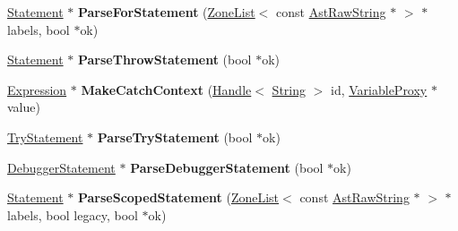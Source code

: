 \begin{DoxyCompactItemize}
\item 
\hyperlink{classv8_1_1internal_1_1_statement}{Statement} $\ast$ {\bfseries Parse\+For\+Statement} (\hyperlink{classv8_1_1internal_1_1_zone_list}{Zone\+List}$<$ const \hyperlink{classv8_1_1internal_1_1_ast_raw_string}{Ast\+Raw\+String} $\ast$ $>$ $\ast$labels, bool $\ast$ok)\hypertarget{classv8_1_1internal_1_1_parser_a984315c07481790a7187dc8eb215338a}{}\label{classv8_1_1internal_1_1_parser_a984315c07481790a7187dc8eb215338a}

\item 
\hyperlink{classv8_1_1internal_1_1_statement}{Statement} $\ast$ {\bfseries Parse\+Throw\+Statement} (bool $\ast$ok)\hypertarget{classv8_1_1internal_1_1_parser_af042949530acf4f0f1e271abb1c298c9}{}\label{classv8_1_1internal_1_1_parser_af042949530acf4f0f1e271abb1c298c9}

\item 
\hyperlink{classv8_1_1internal_1_1_expression}{Expression} $\ast$ {\bfseries Make\+Catch\+Context} (\hyperlink{classv8_1_1internal_1_1_handle}{Handle}$<$ \hyperlink{classv8_1_1internal_1_1_string}{String} $>$ id, \hyperlink{classv8_1_1internal_1_1_variable_proxy}{Variable\+Proxy} $\ast$value)\hypertarget{classv8_1_1internal_1_1_parser_abda7392f0678d1a67540da2f5b2a5913}{}\label{classv8_1_1internal_1_1_parser_abda7392f0678d1a67540da2f5b2a5913}

\item 
\hyperlink{classv8_1_1internal_1_1_try_statement}{Try\+Statement} $\ast$ {\bfseries Parse\+Try\+Statement} (bool $\ast$ok)\hypertarget{classv8_1_1internal_1_1_parser_af61258ccfc1f0ebdc9baea3230cdc54f}{}\label{classv8_1_1internal_1_1_parser_af61258ccfc1f0ebdc9baea3230cdc54f}

\item 
\hyperlink{classv8_1_1internal_1_1_debugger_statement}{Debugger\+Statement} $\ast$ {\bfseries Parse\+Debugger\+Statement} (bool $\ast$ok)\hypertarget{classv8_1_1internal_1_1_parser_ad9d8623ed77f9a8dceb0f0b2b85c231b}{}\label{classv8_1_1internal_1_1_parser_ad9d8623ed77f9a8dceb0f0b2b85c231b}

\item 
\hyperlink{classv8_1_1internal_1_1_statement}{Statement} $\ast$ {\bfseries Parse\+Scoped\+Statement} (\hyperlink{classv8_1_1internal_1_1_zone_list}{Zone\+List}$<$ const \hyperlink{classv8_1_1internal_1_1_ast_raw_string}{Ast\+Raw\+String} $\ast$ $>$ $\ast$labels, bool legacy, bool $\ast$ok)\hypertarget{classv8_1_1internal_1_1_parser_a53da28fcd75c97b2e8ef4c085af27d4e}{}\label{classv8_1_1internal_1_1_parser_a53da28fcd75c97b2e8ef4c085af27d4e}


\end{DoxyCompactItemize}
